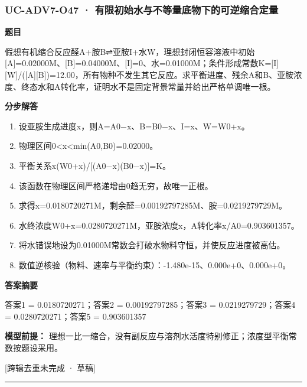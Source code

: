 \documentclass[UTF8,11pt,a4paper]{ctexart}
\begin{document}
\subsubsection*{UC-ADV7-O47 · 有限初始水与不等量底物下的可逆缩合定量}
\noindent\textbf{题目}\par
假想有机缩合反应醛A+胺B⇌亚胺I+水W，理想封闭恒容溶液中初始[A]=0.02000M、[B]=0.04000M、[I]=0、水=0.01000M；条件形成常数K=[I][W]/([A][B])=12.00，所有物种不发生其它反应。求平衡进度、残余A和B、亚胺浓度、终态水和A转化率，证明水不是固定背景常量并给出严格单调唯一根。\par
\medskip\noindent\textbf{分步解答}
\begin{enumerate}
\item 设亚胺生成进度x，则A=A0−x、B=B0−x、I=x、W=W0+x。
\item 物理区间0<x<min(A0,B0)=0.02000。
\item 平衡关系x(W0+x)/[(A0−x)(B0−x)]=K。
\item 该函数在物理区间严格递增由0趋无穷，故唯一正根。
\item 求得x=0.0180720271M，剩余醛=0.00192797285M、胺=0.0219279729M。
\item 水终浓度W0+x=0.0280720271M，亚胺浓度x，A转化率x/A0=0.903601357。
\item 将水错误地设为0.01000M常数会打破水物料守恒，并使反应进度被高估。
\item 数值逆核验（物料、速率与平衡约束）：-1.480e-15、0.000e+0、0.000e+0。
\end{enumerate}
\noindent\textbf{答案摘要}\par
答案1 = 0.0180720271；答案2 = 0.00192797285；答案3 = 0.0219279729；答案4 = 0.0280720271；答案5 = 0.903601357\par
\noindent\textbf{模型前提：}
理想一比一缩合，没有副反应与溶剂水活度特别修正；浓度型平衡常数按题设采用。\par
\noindent\textcolor{red!65!black}{[跨辑去重未完成 · 草稿]} \par
\medskip\hrule\medskip
{}
\end{document}
